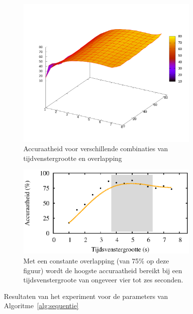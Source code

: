 \documentclass{article}
\begin{document}
\begin{figure}[h]
\centering

  \begin{subfigure}[b]{.99\linewidth}
    \centering
    \includegraphics[width=0.99\textwidth]{figures/3dplot}
    \caption{Accuraatheid voor verschillende combinaties van tijdvenstergrootte en overlapping}\label{fig:3d}
  \end{subfigure}

  \begin{subfigure}[b]{.99\linewidth}
    \centering
    \includegraphics[width=0.99\textwidth]{figures/constantoverlap}
    \caption{Met een constante overlapping (van 75\% op deze figuur) wordt de hoogste accuraatheid bereikt bij een tijdsvenstergroote van ongeveer vier tot zes seconden.}\label{fig:seq2d}
  \end{subfigure}
  
  \caption{Resultaten van het experiment voor de parameters van Algoritme~\ref{alg:sequentie}}
  \label{fig:expsequenties}
  
\end{figure}
\end{document}
